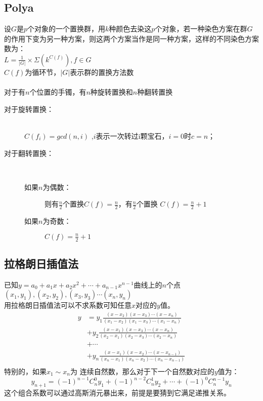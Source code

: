 \subsection{Polya}
	设$G$是$p$个对象的一个置换群，用$k$种颜色去染这$p$个对象，若一种染色方案在群$G$的作用下变为另一种方案，则这两个方案当作是同一种方案，这样的不同染色方案数为：\\
	$L=\frac{1}{\left |G  \right |}\times \Sigma(k^{C(f)}), f\in G$\\
	$C(f)$为循环节，$\left |G  \right |$表示群的置换方法数\\
	\\
	对于有$n$个位置的手镯，有$n$种旋转置换和$n$种翻转置换
	\begin{description}
		\item[对于旋转置换：] ~\\
		$C(f_i)=gcd(n,i)$ ,$i$表示一次转过i颗宝石，$i=0$时$c=n$；\\
		\item[对于翻转置换：] ~\\
		\begin{description}
			\item[如果$n$为偶数：] 则有$\frac{n}{2}$个置换$C(f)=\frac{n}{2}$，有$\frac{n}{2}$个置换 $C(f)=\frac{n}{2}+1$\\
			\item[如果$n$为奇数：] $C(f)=\frac{n}{2}+1$\\
		\end{description}
	\end{description}

	\subsection{拉格朗日插值法}
	已知$y=a_0+a_1x+a_2x^2+\cdots +a_{n-1}x^{n-1}$曲线上的$n$个点$(x_1,y_1),(x_2,y_2),(x_3,y_3)\cdots (x_n,y_n)$\\
	用拉格朗日插值法可以不求系数可知任意$x$对应的$y$值。\\
	\[ \begin{split}
	y &= y_1\frac{(x-x_2)(x-x_3)\cdots (x-x_n)}{(x_1-x_2)(x_1-x_3)\cdots (x_1-x_n)}\\
	&+ y_2\frac{(x-x_1)(x-x_3)\cdots (x-x_n)}{(x_2-x_1)(x_2-x_3)\cdots (x_2-x_n)}\\
	&+ \cdots \\
	&+ y_n\frac{(x-x_1)(x-x_2)\cdots (x-x_{n-1})}{(x_n-x_1)(x_n-x_2)\cdots (x_n-x_{n-1})}\\
	\end{split}\]
	特别的，如果$x_1\sim x_n$为 连续自然数，那么对于下一个自然数对应的$y$值为：\\
	\[y_{n+1}=(-1)^{n-1}C_n^0y_1+(-1)^{n-2}C_n^1y_2+\cdots +(-1)^0C_n^{n-1}y_n\]
	这个组合系数可以通过高斯消元暴出来，前提是要猜到它满足递推关系。\\
	
